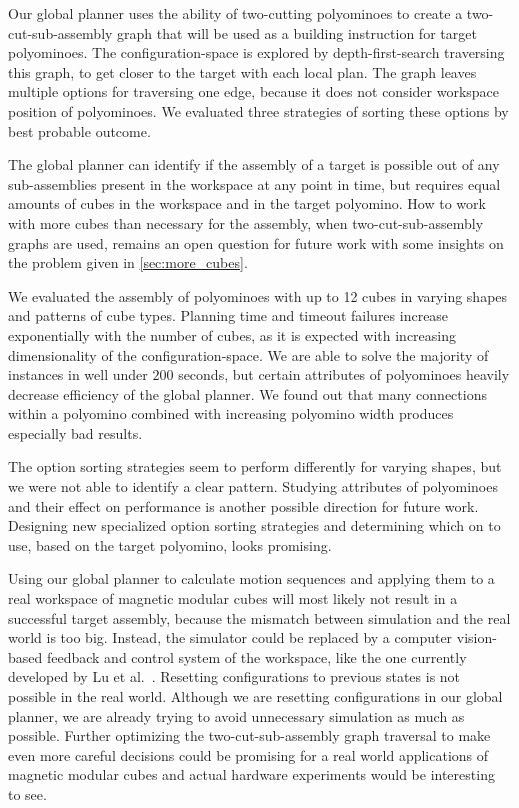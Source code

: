 Our global planner uses the ability of two-cutting polyominoes to create a two-cut-sub-assembly graph that will be used as a building instruction for target polyominoes.
The configuration-space is explored by depth-first-search traversing this graph, to get closer to the target with each local plan.
The graph leaves multiple options for traversing one edge, because it does not consider workspace position of polyominoes. 
We evaluated three strategies of sorting these options by best probable outcome.

The global planner can identify if the assembly of a target is possible out of any sub-assemblies present in the workspace at any point in time, but requires equal amounts of cubes in the workspace and in the target polyomino.
How to work with more cubes than necessary for the assembly, when two-cut-sub-assembly graphs are used, remains an open question for future work with some insights on the problem given in \autoref{sec:more_cubes}.

We evaluated the assembly of polyominoes with up to 12 cubes in varying shapes and patterns of cube types.
Planning time and timeout failures increase exponentially with the number of cubes, as it is expected with increasing dimensionality of the configuration-space.
We are able to solve the majority of instances in well under $200$ seconds, but certain attributes of polyominoes heavily decrease efficiency of the global planner.
We found out that many connections within a polyomino combined with increasing polyomino width produces especially bad results.

The option sorting strategies seem to perform differently for varying shapes, but we were not able to identify a clear pattern.
Studying attributes of polyominoes and their effect on performance is another possible direction for future work.
Designing new specialized option sorting strategies and determining which on to use, based on the target polyomino, looks promising. 

Using our global planner to calculate motion sequences and applying them to a real workspace of magnetic modular cubes will most likely not result in a successful target assembly, because the mismatch between simulation and the real world is too big.
Instead, the simulator could be replaced by a computer vision-based feedback and control system of the workspace, like the one currently developed by Lu et al.\ \cite{Lu2023}.
Resetting configurations to previous states is not possible in the real world.
Although we are resetting configurations in our global planner, we are already trying to avoid unnecessary simulation as much as possible.
Further optimizing the two-cut-sub-assembly graph traversal to make even more careful decisions could be promising for a real world applications of magnetic modular cubes and actual hardware experiments would be interesting to see.







